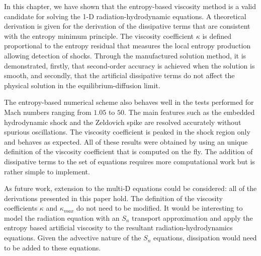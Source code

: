 In this chapter, we have shown that the entropy-based viscosity method is a valid candidate for solving the 1-D radiation-hydrodynamic equations. A theoretical derivation is given for the derivation of the dissipative terms that are consistent with the entropy minimum principle. The viscosity coefficient $\kappa$ is defined proportional to the entropy residual that measures the local entropy production allowing detection of shocks. Through the manufactured solution method, it is demonstrated, firstly, that second-order accuracy is achieved when the solution is smooth, and secondly, that the artificial dissipative terms do not affect the physical solution in the equilibrium-diffusion limit. 

The entropy-based numerical scheme also behaves well in the tests performed for Mach numbers ranging from $1.05$ to $50$. The main features such as the embedded hydrodynamic shock and the Zeldovich spike are resolved accurately without spurious oscillations. The viscosity coefficient is peaked in the shock region only and behaves as expected. All of these results were obtained by using an unique definition of the viscosity coefficient that is computed on the fly. The addition of dissipative terms to the set of equations requires more computational work but is rather simple to implement.

As future work, extension to the multi-D equations could be considered: all of the derivations presented in this paper hold. The definition of the viscosity coefficients $\kappa$ and $\kappa_{max}$ do not need to be modified. It would be interesting to model the radiation equation with an $S_n$ transport approximation and apply the entropy based artificial viscosity to the resultant radiation-hydrodynamics equations. Given the advective nature of the $S_n$ equations, dissipation would need to be added to these equations.